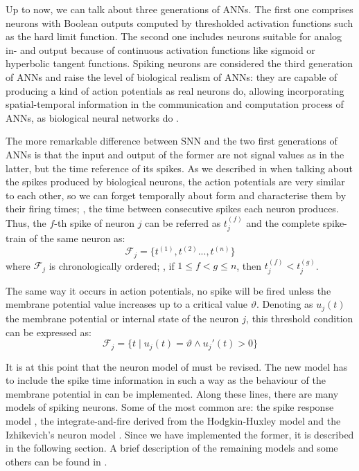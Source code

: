 
\label{subsec:ANN:SNN}

Up to now, we can talk about three generations of ANNs.
The first one comprises neurons with Boolean outputs computed by thresholded activation functions such as the hard limit function. 
The second one includes neurons suitable for analog in- and output because of continuous activation functions like sigmoid or hyperbolic tangent functions.
Spiking neurons are considered the third generation of ANNs and raise the level of biological realism of ANNs: they are capable of producing a kind of action potentials as real neurons do, allowing incorporating spatial-temporal information in the communication and computation process of ANNs, as biological neural networks do \cite{vreeken2002spiking}.

The more remarkable difference between SNN and the two first generations of ANNs is that 
the input and output of the former are not signal values as in the latter,
but the time reference of its spikes.
As we described in  when talking about the spikes produced by biological neurons, 
the action potentials are very similar to each other, 
so we can forget temporally about form and characterise them by their firing times; \ie, the time between consecutive spikes each neuron produces. Thus, the $f$-th spike of neuron $j$ can be referred as $t_{j}^{(f)}$ and the complete spike-train of the same neuron as: 
\begin{equation}
\mathcal{F}_{j}=\{t^{(1)},t^{(2)}...,t^{(n)}\}
\label{eq:spiketrain}
\end{equation}
where $\mathcal{F}_{j}$ is chronologically ordered; \ie,
if $1\leq f<g \leq n$, then $t_{j}^{(f)} < t_{j}^{(g)}$.

The same way it occurs in action potentials, no spike will be fired unless the membrane potential value increases up to a critical value $\vartheta$. Denoting as $u_{j}(t)$ the membrane potential or internal state of the neuron $j$, this threshold condition can be expressed as:
\begin{equation}
\mathcal{F}_{j}=\{t\mid u_{j}(t)=\vartheta\wedge u_{j}'(t)>0\}
\label{eq:thresspikecondition}
\end{equation}

It is at this point that the neuron model of  must be revised. 
The new model has to include the spike time information in such a way as the behaviour of the membrane potential in  can be implemented. 
Along these lines, there are many models of spiking neurons. Some of the most common are:
the spike response model \cite{gerstner2002spiking}, the integrate-and-fire derived from the Hodgkin-Huxley model \cite{chiu1979quantitative} and the Izhikevich's neuron model \cite{izhikevich2003simple}.
Since we have implemented the former, it is described in the following section. A brief description of the remaining models and some others can be found in \cite{paugam2012computing}.







